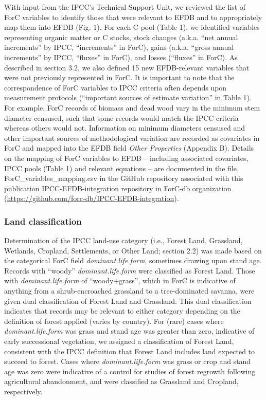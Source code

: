 \documentclass[, manuscript]{copernicus}
\begin{document}
With input from the IPCC's Technical Support Unit, we reviewed the list
of ForC variables to identify those that were relevant to EFDB and to
appropriately map them into EFDB (Fig. 1). For each C pool (Table 1), we
identified variables representing organic matter or C stocks, stock
changes (a.k.a. ``net annual increments'' by IPCC, ``increments'' in
ForC), gains (a.k.a. ``gross annual increments'' by IPCC, ``fluxes'' in
ForC), and losses (``fluxes'' in ForC). As described in section 3.2, we
also defined 15 new EFDB-relevant variables that were not previously
represented in ForC. It is important to note that the correspondence of
ForC variables to IPCC criteria often depends upon measurement protocols
(``important sources of estimate variation'' in Table 1). For example,
ForC records of biomass and dead wood vary in the minimum stem diameter
censused, such that some records would match the IPCC criteria whereas
others would not. Information on minimum diameters censused and other
important sources of methodological variation are recorded as covariates
in ForC and mapped into the EFDB field \emph{Other Properties} (Appendix
B). Details on the mapping of ForC variables to EFDB -- including
associated covariates, IPCC pools (Table 1) and relevant equations
\citep{ipcc_2006_2006} -- are documented in the file
ForC\_variables\_mapping.csv in the GitHub repository associated with
this publication IPCC-EFDB-integration repository in ForC-db
organization (\url{https://github.com/forc-db/IPCC-EFDB-integration}).

\subsubsection{Land classification}

Determination of the IPCC land-use category (i.e., Forest Land,
Grassland, Wetlands, Cropland, Settlements, or Other Land; section 2.2)
was made based on the categorical ForC field \emph{dominant.life.form},
sometimes drawing upon stand age. Records with ``woody''
\emph{dominant.life.form} were classified as Forest Land. Those with
\emph{dominant.life.form} of ``woody+grass'', which in ForC is
indicative of anything from a shrub-encroached grassland to a
tree-dominated savanna, were given dual classification of Forest Land
and Grassland. This dual classification indicates that records may be
relevant to either category depending on the definition of forest
applied (varies by country). For (rare) cases where
\emph{dominant.life.form} was grass and stand age was greater than zero,
indicative of early successional vegetation, we assigned a
classification of Forest Land, consistent with the IPCC definition that
Forest Land includes land expected to succeed to forest. Cases where
\emph{dominant.life.form} was grass or crop and stand age was zero were
indicative of a control for studies of forest regrowth following
agricultural abandonment, and were classified as Grassland and Cropland,
respectively.
\end{document}
